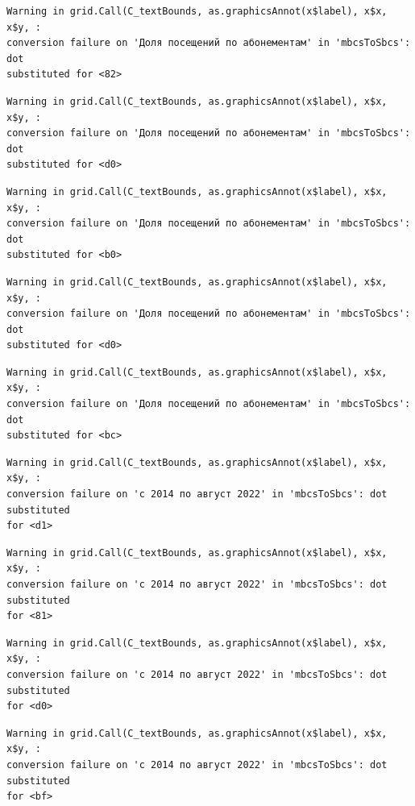 \documentclass[
  letterpaper,
  DIV=11,
  numbers=noendperiod]{scrartcl}
\begin{document}
\begin{verbatim}
Warning in grid.Call(C_textBounds, as.graphicsAnnot(x$label), x$x, x$y, :
conversion failure on 'Доля посещений по абонементам' in 'mbcsToSbcs': dot
substituted for <82>
\end{verbatim}

\begin{verbatim}
Warning in grid.Call(C_textBounds, as.graphicsAnnot(x$label), x$x, x$y, :
conversion failure on 'Доля посещений по абонементам' in 'mbcsToSbcs': dot
substituted for <d0>
\end{verbatim}

\begin{verbatim}
Warning in grid.Call(C_textBounds, as.graphicsAnnot(x$label), x$x, x$y, :
conversion failure on 'Доля посещений по абонементам' in 'mbcsToSbcs': dot
substituted for <b0>
\end{verbatim}

\begin{verbatim}
Warning in grid.Call(C_textBounds, as.graphicsAnnot(x$label), x$x, x$y, :
conversion failure on 'Доля посещений по абонементам' in 'mbcsToSbcs': dot
substituted for <d0>
\end{verbatim}

\begin{verbatim}
Warning in grid.Call(C_textBounds, as.graphicsAnnot(x$label), x$x, x$y, :
conversion failure on 'Доля посещений по абонементам' in 'mbcsToSbcs': dot
substituted for <bc>
\end{verbatim}

\begin{verbatim}
Warning in grid.Call(C_textBounds, as.graphicsAnnot(x$label), x$x, x$y, :
conversion failure on 'с 2014 по август 2022' in 'mbcsToSbcs': dot substituted
for <d1>
\end{verbatim}

\begin{verbatim}
Warning in grid.Call(C_textBounds, as.graphicsAnnot(x$label), x$x, x$y, :
conversion failure on 'с 2014 по август 2022' in 'mbcsToSbcs': dot substituted
for <81>
\end{verbatim}

\begin{verbatim}
Warning in grid.Call(C_textBounds, as.graphicsAnnot(x$label), x$x, x$y, :
conversion failure on 'с 2014 по август 2022' in 'mbcsToSbcs': dot substituted
for <d0>
\end{verbatim}

\begin{verbatim}
Warning in grid.Call(C_textBounds, as.graphicsAnnot(x$label), x$x, x$y, :
conversion failure on 'с 2014 по август 2022' in 'mbcsToSbcs': dot substituted
for <bf>
\end{verbatim}
\end{document}
